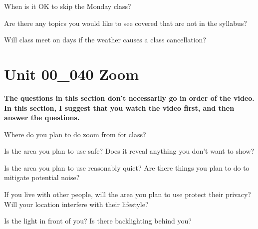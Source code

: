 \documentclass[letterpaper,12pt]{exam}
\newcommand{\unit}{Unit 00}
\begin{document}
\begin{questions}
\begin{samepage}
	\question When is it OK to skip the Monday class?
	\vspace{5mm}
\end{samepage}

\begin{samepage}
	\question Are there any topics you would like to see covered that are not in the syllabus?
	\vspace{5mm}
\end{samepage}

\begin{samepage}
	\question Will class meet on days if the weather causes a class cancellation?
	\vspace{5mm}
\end{samepage}

\section*{\unit\_040 Zoom} %

\noindent  \textbf{The questions in this section don't necessarily go in order of the video.  In this section, I suggest that you watch the video first, and then answer the questions.}

\begin{samepage}
	\question Where do you plan to do zoom from for class?
	\vspace{5mm}
\end{samepage}

\begin{samepage}
	\question Is the area you plan to use safe?  Does it reveal anything you don't want to show?
	\vspace{5mm}
\end{samepage}

\begin{samepage}
	\question Is the area you plan to use reasonably quiet?  Are there things you plan to do to mitigate potential noise?
	\vspace{5mm}
\end{samepage}

\begin{samepage}
	\question If you live with other people, will the area you plan to use protect their privacy?  Will your location interfere with their lifestyle?
	\vspace{5mm}
\end{samepage}


\begin{samepage}
	\question Is the light in front of you?  Is there backlighting behind you?
	\vspace{5mm}
\end{samepage}


\end{questions}
\end{document}
